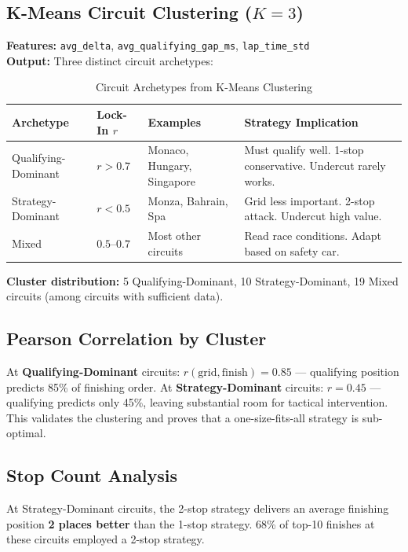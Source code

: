 \documentclass[12pt, a4paper]{article}
\begin{document}
\subsection{K-Means Circuit Clustering ($K=3$)}
\textbf{Features:} \texttt{avg\_delta}, \texttt{avg\_qualifying\_gap\_ms}, \texttt{lap\_time\_std}\\
\textbf{Output:} Three distinct circuit archetypes:

\begin{table}[H]
\centering
\caption{Circuit Archetypes from K-Means Clustering}
\begin{tabularx}{\textwidth}{l l l X}
\toprule
\textbf{Archetype} & \textbf{Lock-In $r$} & \textbf{Examples} & \textbf{Strategy Implication} \\
\midrule
Qualifying-Dominant & $r > 0.7$ & Monaco, Hungary, Singapore & Must qualify well. 1-stop conservative. Undercut rarely works. \\
Strategy-Dominant   & $r < 0.5$ & Monza, Bahrain, Spa & Grid less important. 2-stop attack. Undercut high value. \\
Mixed               & $0.5$--$0.7$ & Most other circuits & Read race conditions. Adapt based on safety car. \\
\bottomrule
\end{tabularx}
\end{table}

\textbf{Cluster distribution:} 5 Qualifying-Dominant, 10 Strategy-Dominant, 19 Mixed circuits (among circuits with sufficient data).

\subsection{Pearson Correlation by Cluster}
At \textbf{Qualifying-Dominant} circuits: $r(\text{grid}, \text{finish}) = 0.85$ --- qualifying position predicts 85\% of finishing order. At \textbf{Strategy-Dominant} circuits: $r = 0.45$ --- qualifying predicts only 45\%, leaving substantial room for tactical intervention. This validates the clustering and proves that a one-size-fits-all strategy is sub-optimal.

\subsection{Stop Count Analysis}
At Strategy-Dominant circuits, the 2-stop strategy delivers an average finishing position \textbf{2 places better} than the 1-stop strategy. 68\% of top-10 finishes at these circuits employed a 2-stop strategy.
\end{document}
